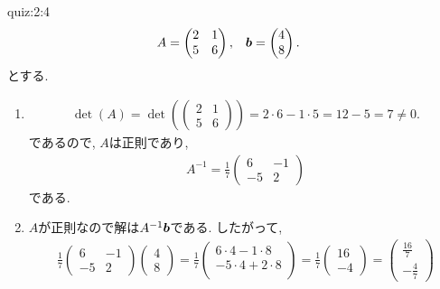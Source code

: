\begin{answerof}{quiz:2:4}
  \begin{align*}
    A&=\begin{pmatrix}
      2&1\\5&6
    \end{pmatrix},&
    \boldsymbol{b}&=\begin{pmatrix}
      4\\8
    \end{pmatrix}.   
  \end{align*}
  とする.
\begin{enumerate}
\item
  \begin{align*}
    \det(A)=
    \det(\begin{pmatrix}
      2&1\\5&6
    \end{pmatrix})=2\cdot 6 -1\cdot 5=12-5=7\neq 0.
  \end{align*}
  であるので,
  $A$は正則であり,
  \begin{align*}
     A^{-1}=
     \frac{1}{7}
     \begin{pmatrix}
      6&-1\\-5&2
    \end{pmatrix}
  \end{align*}
  である.

\item
  $A$が正則なので解は$A^{-1}\boldsymbol{b}$である.
  したがって,
  \begin{align*}
    \frac{1}{7}\begin{pmatrix}
      6&-1\\-5&2
    \end{pmatrix}
    \begin{pmatrix}
      4\\8
    \end{pmatrix}
    =
    \frac{1}{7}\begin{pmatrix}
      6\cdot 4 -1\cdot 8\\
      -5\cdot 4 +2\cdot 8\\
    \end{pmatrix}
    =
    \frac{1}{7}\begin{pmatrix}
      16\\-4
    \end{pmatrix}
    =
    \begin{pmatrix}
      \frac{16}{7}\\-\frac{4}{7}
    \end{pmatrix}
  \end{align*}

\end{enumerate}
\end{answerof}
